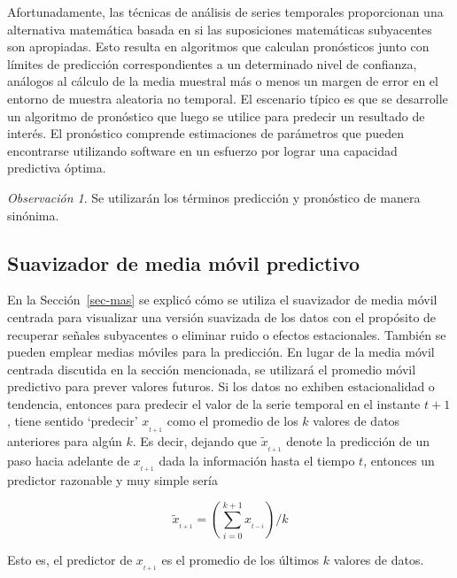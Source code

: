 \documentclass[
  us-letterpaper,
]{scrreprt}
\theoremstyle{plain}
\theoremstyle{definition}
\theoremstyle{plain}
\theoremstyle{definition}
\theoremstyle{remark}
\newtheorem*{remark}{Observación}
\begin{document}
Afortunadamente, las técnicas de análisis de series temporales
proporcionan una alternativa matemática basada en si las suposiciones
matemáticas subyacentes son apropiadas. Esto resulta en algoritmos que
calculan pronósticos junto con límites de predicción correspondientes a
un determinado nivel de confianza, análogos al cálculo de la media
muestral más o menos un margen de error en el entorno de muestra
aleatoria no temporal. El escenario típico es que se desarrolle un
algoritmo de pronóstico que luego se utilice para predecir un resultado
de interés. El pronóstico comprende estimaciones de parámetros que
pueden encontrarse utilizando software en un esfuerzo por lograr una
capacidad predictiva óptima.

\begin{remark}
Se utilizarán los términos predicción y pronóstico de manera sinónima.
\end{remark}

\subsection{Suavizador de media móvil
predictivo}\label{suavizador-de-media-muxf3vil-predictivo}

En la Sección~\ref{sec-mas} se explicó cómo se utiliza el suavizador de
media móvil centrada para visualizar una versión suavizada de los datos
con el propósito de recuperar señales subyacentes o eliminar ruido o
efectos estacionales. También se pueden emplear medias móviles para la
predicción. En lugar de la media móvil centrada discutida en la sección
mencionada, se utilizará el promedio móvil predictivo para prever
valores futuros. Si los datos no exhiben estacionalidad o tendencia,
entonces para predecir el valor de la serie temporal en el instante
\(t+1\), tiene sentido `predecir' \(x_{_{t+1}}\) como el promedio de los
\(k\) valores de datos anteriores para algún \(k\). Es decir, dejando
que \(\tilde{x}_{_{t+1}}\) denote la predicción de un paso hacia
adelante de \(x_{_{t+1}}\) dada la información hasta el tiempo \(t\),
entonces un predictor razonable y muy simple sería

\[
\tilde{x}_{_{t+1}}=\left(\sum\limits_{i=0}^{k+1}x_{_{t-i}}\right)/k
\]

Esto es, el predictor de \(x_{_{t+1}}\) es el promedio de los últimos
\(k\) valores de datos.
\end{document}
